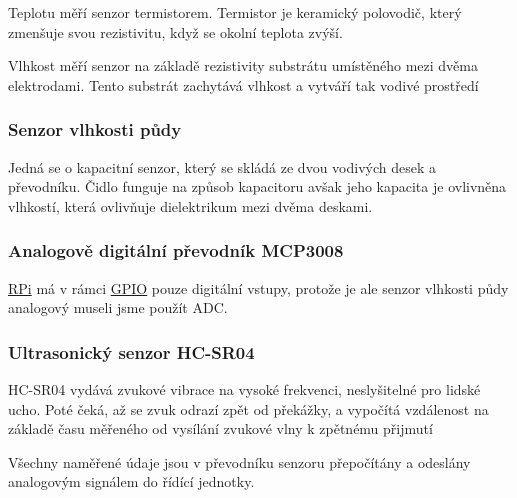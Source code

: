 \documentclass[12pt,a4paper]{article}
\begin{document}
Teplotu měří senzor termistorem. Termistor je keramický polovodič, který zmenšuje svou rezistivitu, když se okolní teplota zvýší.

Vlhkost měří senzor na základě rezistivity substrátu umístěného mezi dvěma elektrodami. Tento substrát zachytává vlhkost a vytváří tak vodivé prostředí

\subsubsection{Senzor vlhkosti půdy}

Jedná se o kapacitní senzor, který se skládá ze dvou vodivých desek a převodníku. Čidlo funguje na způsob kapacitoru avšak jeho kapacita je ovlivněna vlhkostí, která ovlivňuje dielektrikum mezi dvěma deskami.

\subsubsection{Analogově digitální převodník MCP3008}

\underline{\ac{RPi}} má v rámci \underline{\ac{GPIO}} pouze digitální vstupy, protože je ale senzor vlhkosti půdy analogový museli jsme použít \ac{ADC}.



\subsubsection{Ultrasonický senzor HC-SR04}

\ac{HC-SR04} vydává zvukové vibrace na vysoké frekvenci, neslyšitelné pro lidské ucho. Poté čeká, až se zvuk odrazí zpět od překážky, a vypočítá vzdálenost na základě času měřeného od vysílání zvukové vlny k zpětnému přijmutí

Všechny naměřené údaje jsou v převodníku senzoru přepočítány a odeslány analogovým signálem do řídící jednotky.
\end{document}
